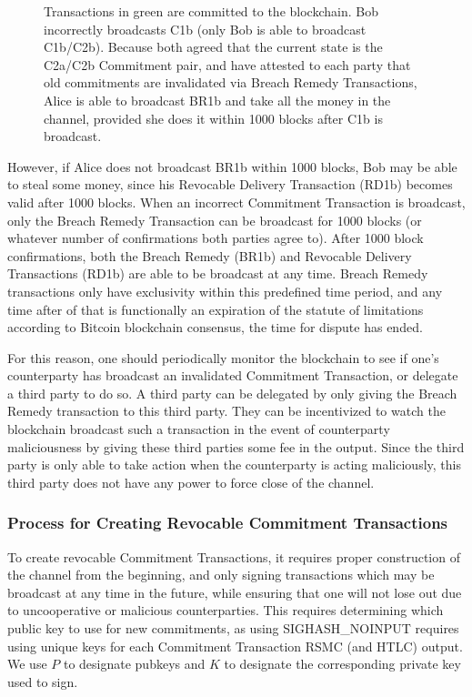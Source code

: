 \documentclass[letterpaper,11pt]{article}
\begin{document}
\begin{figure}[H]
	\caption{
		Transactions in green are committed to the blockchain. Bob
		incorrectly broadcasts C1b (only Bob is able to broadcast
		C1b/C2b). Because both agreed that the current state is the
		C2a/C2b Commitment pair, and have attested to each party that
		old commitments are invalidated via Breach Remedy Transactions,
		Alice is able to broadcast BR1b and take all the money in the
		channel, provided she does it within 1000 blocks after C1b is
		broadcast.
	}
\end{figure}

However, if Alice does not broadcast BR1b within 1000 blocks, Bob may be able to
steal some money, since his Revocable Delivery Transaction (RD1b) becomes valid
after 1000 blocks. When an incorrect Commitment Transaction is broadcast, only
the Breach Remedy Transaction can be broadcast for 1000 blocks (or whatever
number of confirmations both parties agree to). After 1000 block confirmations,
both the Breach Remedy (BR1b) and Revocable Delivery Transactions (RD1b) are
able to be broadcast at any time. Breach Remedy transactions only have
exclusivity within this predefined time period, and any time after of that is
functionally an expiration of the statute of limitations \textemdash according
to Bitcoin blockchain consensus, the time for dispute has ended. 

For this reason, one should periodically monitor the blockchain to see if one's
counterparty has broadcast an invalidated Commitment Transaction, or delegate a
third party to do so. A third party can be delegated by only giving the Breach
Remedy transaction to this third party. They can be incentivized to watch the
blockchain broadcast such a transaction in the event of counterparty
maliciousness by giving these third parties some fee in the output. Since the
third party is only able to take action when the counterparty is acting
maliciously, this third party does not have any power to force close of the
channel.

\subsubsection{Process for Creating Revocable Commitment Transactions}

To create revocable Commitment Transactions, it requires proper construction of
the channel from the beginning, and only signing transactions which may be
broadcast at any time in the future, while ensuring that one will not lose out
due to uncooperative or malicious counterparties. This requires determining
which public key to use for new commitments, as using SIGHASH\_NOINPUT requires
using unique keys for each Commitment Transaction RSMC (and HTLC) output. We use
$P$ to designate pubkeys and $K$ to designate the corresponding private key used
to sign.
\end{document}
